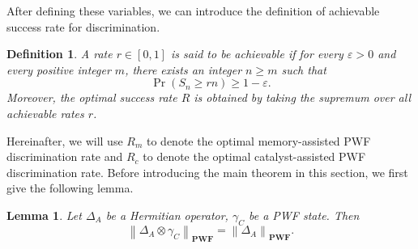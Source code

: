 \documentclass[aps,pra,twocolumn,floatfix,amsfonts,10pt]{revtex4-2}
\newtheorem{definition}{Definition}
\newtheorem{lemma}{Lemma}
\begin{document}
After defining these variables, we can introduce the definition of achievable success rate for discrimination.
\begin{definition}
	A rate $r\in[0,1]$ is said to be achievable if for every $\varepsilon>0$ and every positive integer $m$, there exists an integer $n\geqslant m$ such that
	\begin{equation}
		\Pr(S_n\geqslant rn)\geqslant 1-\varepsilon.
	\end{equation}
	Moreover, the optimal success rate $R$ is obtained by taking the supremum over all achievable rates $r$.
\end{definition}
Hereinafter, we will use $R_m$ to denote the optimal memory-assisted PWF discrimination rate and $R_c$ to denote the optimal catalyst-assisted PWF discrimination rate.
Before introducing the main theorem in this section, we first give the following lemma.

\begin{lemma}\label{lemma1}
	Let $\Delta_A$ be a Hermitian operator, $\gamma_C$ be a PWF state. Then
	\begin{equation}
		\left\|\Delta_A\otimes\gamma_C\right\|_{\mathbf{PWF}}
		=
		\left\|\Delta_A\right\|_{\mathbf{PWF}}.
	\end{equation}
\end{lemma}
\end{document}
